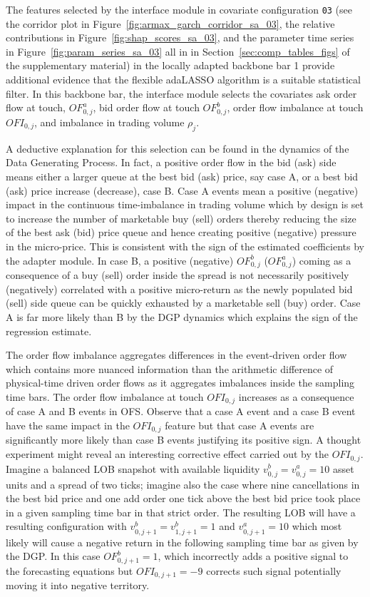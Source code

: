 \documentclass{rQUF2e}
\theoremstyle{plain}
\theoremstyle{definition}
\theoremstyle{remark}
\begin{document}
The features selected by the interface module in covariate configuration \verb|03| (see the corridor plot in Figure~\ref{fig:armax_garch_corridor_sa_03}, the relative contributions in Figure~\ref{fig:shap_scores_sa_03}, and the parameter time series in Figure~\ref{fig:param_series_sa_03} all in in Section~\ref{sec:comp_tables_figs} of the supplementary material) in the locally adapted backbone bar 1 provide additional evidence that the flexible adaLASSO algorithm is a suitable statistical filter. In this backbone bar, the interface module selects the covariates ask order flow at touch, $OF^{a}_{0,j}$, bid order flow at touch $OF^b_{0, j}$, order flow imbalance at touch $OFI_{0,j}$, and imbalance in trading volume $\rho_j$.

A deductive explanation for this selection can be found in the dynamics of the Data Generating Process. In fact, a positive order flow in the bid (ask) side means either a larger queue at the best bid (ask) price, say case A, or a best bid (ask) price increase (decrease), case B. Case A events mean a positive (negative) impact in the continuous time-imbalance in trading volume which by design is set to increase the number of marketable buy (sell) orders thereby reducing the size of the best ask (bid) price queue and hence creating positive (negative) pressure in the micro-price. This is consistent with the sign of the estimated coefficients by the adapter module. In case B, a positive (negative) $OF^{b}_{0, j}$ ($OF^a_{0, j}$) coming as a consequence of a buy (sell) order inside the spread is not necessarily positively (negatively) correlated with a positive micro-return as the newly populated bid (sell) side queue can be quickly exhausted by a marketable sell (buy) order. Case A is far more likely than B by the DGP dynamics which explains the sign of the regression estimate.

The order flow imbalance aggregates differences in the event-driven order flow which contains more nuanced information than the arithmetic difference of physical-time driven order flows as it aggregates imbalances inside the sampling time bars. The order flow imbalance at touch $OFI_{0,j}$ increases as a consequence of case A and B events in OFS. Observe that a case A event and a case B event have the same impact in the $OFI_{0,j}$ feature but that case A events are significantly more likely than case B events justifying its positive sign. A thought experiment might reveal an interesting corrective effect carried out by the $OFI_{0,j}$. Imagine a balanced LOB snapshot with available liquidity $v^{b}_{0, j} = v^a_{0,j} = 10$  asset units and a spread of two ticks; imagine also the case where nine cancellations in the best bid price and one add order one tick above the best bid price took place in a given sampling time bar in that strict order. The resulting LOB will have a resulting configuration with $v^{b}_{0,j + 1} = v^{b}_{1,j + 1} = 1$ and $v^{a}_{0,j + 1} = 10$ which most likely will cause a negative return in the following sampling time bar as given by the DGP. In this case $OF^{b}_{0, j+1} = 1$, which incorrectly adds a positive signal to the forecasting equations but $OFI_{0, j + 1} = -9$ corrects such signal potentially moving it into negative territory.
\end{document}
